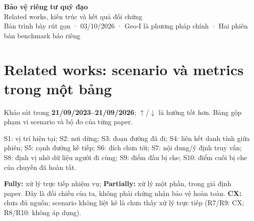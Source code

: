 \documentclass[10pt,a4paper]{article}
\begin{document}
\begin{center}{\LARGE\bfseries\color{ink}Bảo vệ riêng tư quỹ đạo}\\[5pt]{\large Related works, kiến trúc và kết quả đối chứng}\\[4pt]{\small Bản trình bày rút gọn · 03/10/2026 · Geo-I là phương pháp chính · Hai phiên bản benchmark báo riêng}\end{center}
\section{Related works: scenario và metrics trong một bảng}\label{sec:1}
Khảo sát trong \textbf{21/09/2023–21/09/2026}; $\uparrow$/$\downarrow$ là hướng tốt hơn. Bảng gộp phạm vi scenario và bộ đo của từng paper.

S1: vị trí hiện tại; S2: nơi dừng; S3: đoạn đường đã đi; S4: liên kết danh tính giữa phiên; S5: cạnh đường kế tiếp; S6: đích chưa tới; S7: nội dung/ý định truy vấn; S8: định vị nhờ dữ liệu người đi cùng; S9: điểm đầu bị che; S10: điểm cuối bị che của chuyến đã hoàn tất.

\textbf{Fully:} xử lý trực tiếp nhiệm vụ; \textbf{Partially:} xử lý một phần, trong giả định paper. Đây là đối chiếu của ta, không phải chứng nhận bảo vệ hoàn toàn. \textbf{CX:} chưa đủ nguồn; scenario không liệt kê là chưa thấy xử lý trực tiếp (R7/R9: CX; R8/R10: không áp dụng).
\end{document}
